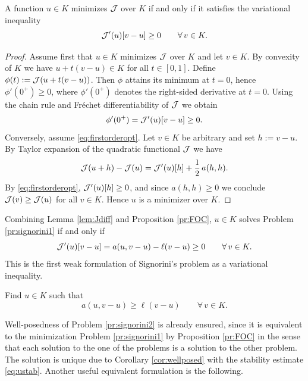 \begin{proposition}\label{pr:FOC}
	A function $u\in K$ minimizes ${\mathcal J}$ over $K$ if and only if it satisfies the variational inequality
	\begin{equation}\label{eq:firstorderopt}
		{\mathcal J}^\prime(u)[v-u]\ge 0\qquad\forall\, v\in K.
	\end{equation}
\end{proposition}
\begin{proof}
	Assume first that $u\in K$ minimizes ${\mathcal J}$ over $K$ and let $v\in K$.
	By convexity of $K$ we have $u+t(v-u)\in K$ for all $t\in[0,1]$.
	Define $\phi(t):={\mathcal J}(u+t(v-u))$. Then $\phi$ attains its minimum at $t=0$, hence $\phi'(0^+)\ge 0$, where $\phi'(0^+)$ denotes the right-sided derivative at $t=0$. Using the chain rule and Fréchet differentiability of ${\mathcal J}$ we obtain
	\begin{equation*}
		\phi'(0^+)={\mathcal J}'(u)[v-u]\ge 0.
	\end{equation*}
	Conversely, assume \eqref{eq:firstorderopt}. Let $v\in K$ be arbitrary and set $h:=v-u$. By Taylor expansion of the quadratic functional ${\mathcal J}$ we have
	\begin{equation*}
		{\mathcal J}(u+h)-{\mathcal J}(u)={\mathcal J}'(u)[h]+\frac12\,a(h,h).
	\end{equation*}
	By \eqref{eq:firstorderopt}, ${\mathcal J}'(u)[h]\ge 0$, and since $a(h,h)\ge 0$ we conclude ${\mathcal J}(v)\ge {\mathcal J}(u)$ for all $v\in K$. Hence $u$ is a minimizer over $K$.
\end{proof}

Combining Lemma \ref{lem:Jdiff} and Proposition \ref{pr:FOC}, $u\in K$ solves Problem \ref{pr:signorini1} if and only if
\begin{equation*}
	{\mathcal J}^\prime(u)[v-u] = a(u,v-u)-\ell(v-u)\ge 0 \qquad \forall\, v\in K.
\end{equation*}
This is the first weak formulation of Signorini's problem as a variational inequality.

\begin{problem}\label{pr:signorini2}
Find $u\in K$ such that
\begin{equation*}
	a(u,v-u)\ge \ell(v-u)\qquad \forall\, v\in K.
\end{equation*}
\end{problem}

Well-posedness of Problem \ref{pr:signorini2} is already ensured, since it is equivalent to the minimization Problem \ref{pr:signorini1} by Proposition \ref{pr:FOC} in the sense that each solution to the one of the problems is a solution to the other problem. The solution is unique due to Corollary \ref{cor:wellposed} with the stability estimate \eqref{eq:ustab}. Another useful equivalent formulation is the following.

